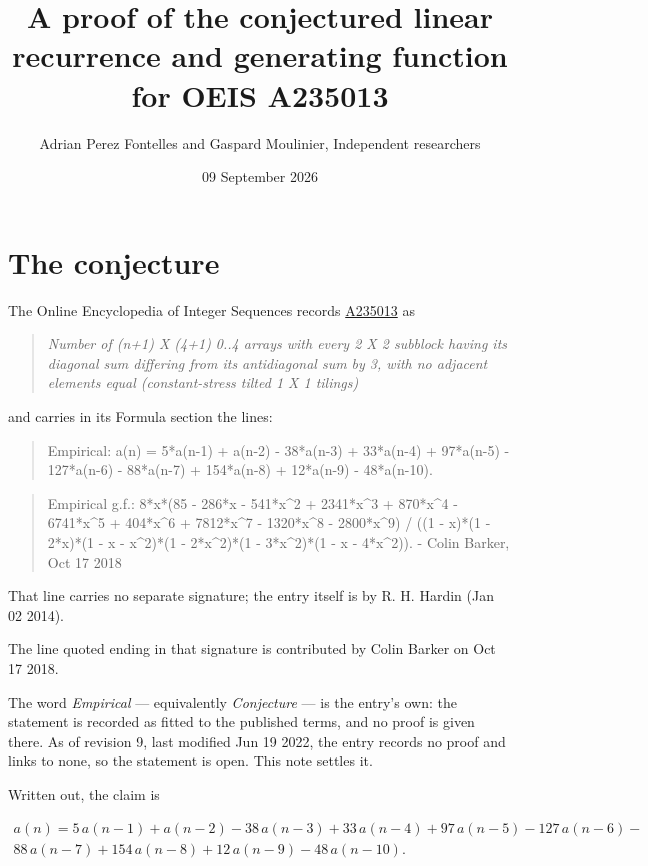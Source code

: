 \documentclass[11pt]{article}
\title{A proof of the conjectured linear recurrence and generating function for OEIS A235013}
\author{Adrian Perez Fontelles and Gaspard Moulinier, Independent researchers}
\date{09 September 2026}
\theoremstyle{definition}
\begin{document}
\maketitle
\section{The conjecture}

The Online Encyclopedia of Integer Sequences records \href{https://oeis.org/A235013}{A235013} as

\begin{quote}\itshape Number of (n+1) X (4+1) 0..4 arrays with every 2 X 2 subblock having its diagonal sum differing from its antidiagonal sum by 3, with no adjacent elements equal (constant-stress tilted 1 X 1 tilings)\end{quote}

and carries in its Formula section the lines:

\begin{quote}\ttfamily Empirical: a(n) = 5*a(n-1) + a(n-2) - 38*a(n-3) + 33*a(n-4) + 97*a(n-5) - 127*a(n-6) - 88*a(n-7) + 154*a(n-8) + 12*a(n-9) - 48*a(n-10).\end{quote}

\begin{quote}\ttfamily Empirical g.f.: 8*x*(85 - 286*x - 541*x\textasciicircum{}2 + 2341*x\textasciicircum{}3 + 870*x\textasciicircum{}4 - 6741*x\textasciicircum{}5 + 404*x\textasciicircum{}6 + 7812*x\textasciicircum{}7 - 1320*x\textasciicircum{}8 - 2800*x\textasciicircum{}9) / ((1 - x)*(1 - 2*x)*(1 - x - x\textasciicircum{}2)*(1 - 2*x\textasciicircum{}2)*(1 - 3*x\textasciicircum{}2)*(1 - x - 4*x\textasciicircum{}2)). - Colin Barker, Oct 17 2018\end{quote}

That line carries no separate signature; the entry itself is by R. H. Hardin (Jan 02 2014).

The line quoted ending in that signature is contributed by Colin Barker on Oct 17 2018.

The word {\itshape Empirical} --- equivalently {\itshape Conjecture} --- is the entry's own: the statement is recorded as fitted to the published terms, and no proof is given there. As of revision 9, last modified Jun 19 2022, the entry records no proof and links to none, so the statement is open. This note settles it.

Written out, the claim is

\begin{multline*} a(n) = 5\,a(n-1) + a(n-2) - 38\,a(n-3) + 33\,a(n-4) + 97\,a(n-5) - 127\,a(n-6) - \\ 88\,a(n-7) + 154\,a(n-8) + 12\,a(n-9) - 48\,a(n-10). \end{multline*}
\end{document}
